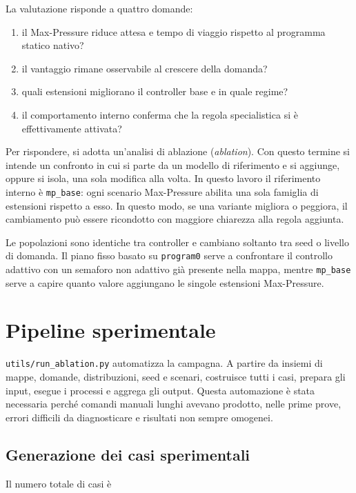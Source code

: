 \documentclass[12pt,a4paper,oneside]{report}
\numberwithin{equation}{chapter}
\begin{document}
La valutazione risponde a quattro domande:

\begin{enumerate}
    \item il Max-Pressure riduce attesa e tempo di viaggio rispetto al programma
    statico nativo?
    \item il vantaggio rimane osservabile al crescere della domanda?
    \item quali estensioni migliorano il controller base e in quale regime?
    \item il comportamento interno conferma che la regola specialistica si è
    effettivamente attivata?
\end{enumerate}

Per rispondere, si adotta un'analisi di ablazione (\emph{ablation}). Con questo
termine si intende un confronto in cui si parte da un modello di riferimento e
si aggiunge, oppure si isola, una sola modifica alla volta. In questo lavoro il
riferimento interno è \texttt{mp\_base}: ogni scenario Max-Pressure abilita una
sola famiglia di estensioni rispetto a esso. In questo modo, se una variante
migliora o peggiora, il cambiamento può essere ricondotto con maggiore chiarezza
alla regola aggiunta.

Le popolazioni sono identiche tra controller e cambiano soltanto tra seed o
livello di domanda. Il piano fisso basato su \texttt{program0} serve a
confrontare il controllo adattivo con un semaforo non adattivo già presente
nella mappa, mentre \texttt{mp\_base} serve a capire quanto valore aggiungano le
singole estensioni Max-Pressure.

\section{Pipeline sperimentale}

\texttt{utils/run\_ablation.py} automatizza la campagna. A partire da insiemi di mappe,
domande, distribuzioni, seed e scenari, costruisce tutti i casi, prepara gli
input, esegue i processi e aggrega gli output. Questa automazione è stata
necessaria perché comandi manuali lunghi avevano prodotto, nelle prime prove,
errori difficili da diagnosticare e risultati non sempre omogenei.

\subsection{Generazione dei casi sperimentali}

Il numero totale di casi è
\end{document}
